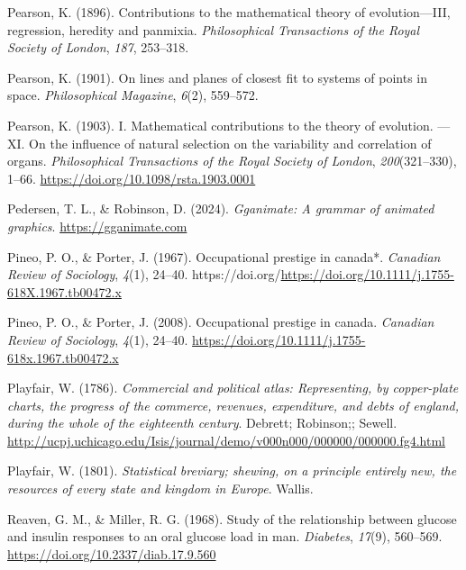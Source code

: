 \documentclass[
  letterpaper,
  10pt,
  krantz2]{krantz}
\newlength{\cslhangindent}
\newenvironment{CSLReferences}[2] %
 {\begin{list}{}{%
  \setlength{\itemindent}{0pt}
  \setlength{\leftmargin}{0pt}
  \setlength{\parsep}{0pt}
  \ifodd #1
   \setlength{\leftmargin}{\cslhangindent}
   \setlength{\itemindent}{-1\cslhangindent}
  \fi
  \setlength{\itemsep}{#2\baselineskip}}}
 {\end{list}}
\begin{document}
\begin{CSLReferences}{1}{0}
Pearson, K. (1896). Contributions to the mathematical theory of
evolution---{III}, regression, heredity and panmixia.
\emph{Philosophical Transactions of the Royal Society of London},
\emph{187}, 253--318.

Pearson, K. (1901). On lines and planes of closest fit to systems of
points in space. \emph{Philosophical Magazine}, \emph{6}(2), 559--572.

Pearson, K. (1903). I. Mathematical contributions to the theory of
evolution. ---XI. On the influence of natural selection on the
variability and correlation of organs. \emph{Philosophical Transactions
of the Royal Society of London}, \emph{200}(321--330), 1--66.
\url{https://doi.org/10.1098/rsta.1903.0001}

Pedersen, T. L., \& Robinson, D. (2024). \emph{Gganimate: A grammar of
animated graphics}. \url{https://gganimate.com}

Pineo, P. O., \& Porter, J. (1967). Occupational prestige in canada*.
\emph{Canadian Review of Sociology}, \emph{4}(1), 24--40.
https://doi.org/\url{https://doi.org/10.1111/j.1755-618X.1967.tb00472.x}

Pineo, P. O., \& Porter, J. (2008). Occupational prestige in canada.
\emph{Canadian Review of Sociology}, \emph{4}(1), 24--40.
\url{https://doi.org/10.1111/j.1755-618x.1967.tb00472.x}

Playfair, W. (1786). \emph{Commercial and political atlas: Representing,
by copper-plate charts, the progress of the commerce, revenues,
expenditure, and debts of england, during the whole of the eighteenth
century}. Debrett; Robinson;; Sewell.
\url{http://ucpj.uchicago.edu/Isis/journal/demo/v000n000/000000/000000.fg4.html}

Playfair, W. (1801). \emph{Statistical breviary; shewing, on a principle
entirely new, the resources of every state and kingdom in {Europe}}.
Wallis.

Reaven, G. M., \& Miller, R. G. (1968). Study of the relationship
between glucose and insulin responses to an oral glucose load in man.
\emph{Diabetes}, \emph{17}(9), 560--569.
\url{https://doi.org/10.2337/diab.17.9.560}


\end{CSLReferences}
\end{document}
